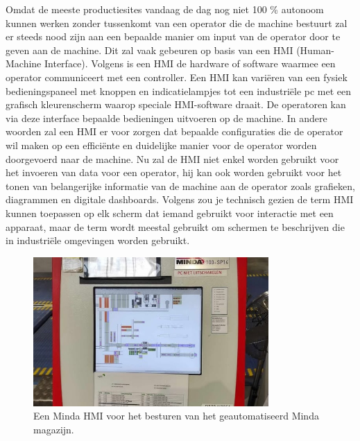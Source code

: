 Omdat de meeste productiesites vandaag de dag nog niet 100 \% autonoom kunnen werken zonder tussenkomt van een operator die de machine bestuurt zal er steeds nood zijn aan een bepaalde manier om input van de operator door te geven aan de machine. Dit zal vaak gebeuren op basis van een HMI (Human-Machine Interface). 
Volgens \textcite{Nist2025} is een HMI de hardware of software waarmee een operator communiceert met een controller. Een HMI kan variëren van een fysiek bedieningspaneel met knoppen en indicatielampjes tot een industriële pc met een grafisch kleurenscherm waarop speciale HMI-software draait. De operatoren kan via deze interface bepaalde bedieningen uitvoeren op de machine. In andere woorden zal een HMI er voor zorgen dat bepaalde configuraties die de operator wil maken op een efficiënte en duidelijke manier voor de operator worden doorgevoerd naar de machine. 
Nu zal de HMI niet enkel worden gebruikt voor het invoeren van data voor een operator, hij kan ook worden gebruikt voor het tonen van belangerijke informatie van de machine aan de operator zoals grafieken, diagrammen en digitale dashboards. \autocite{Inductive2025}
Volgens \textcite{Copadata2025} zou je technisch gezien de term HMI kunnen toepassen op elk scherm dat iemand gebruikt voor interactie met een apparaat, maar de term wordt meestal gebruikt om schermen te beschrijven die in industriële omgevingen worden gebruikt.

\begin{figure}[H]
    \centering
    \includegraphics[width=0.8\textwidth]{fotos/Minda_HMI.jpg}
    \caption[Minda HMI]{\label{fig:grail}Een Minda HMI voor het besturen van het geautomatiseerd Minda magazijn.}
\end{figure} 


